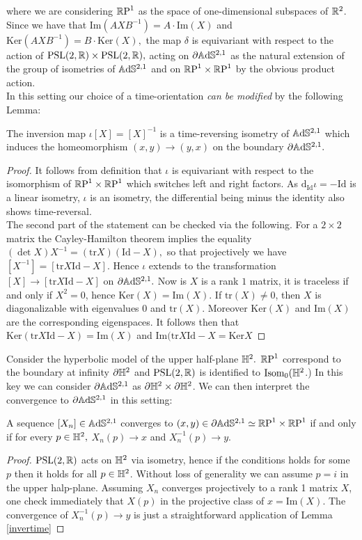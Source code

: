 where we are considering $\mathbb{R}\text{P}^1$ as the space of one-dimensional subspaces of $\mathbb{R}^2$. Since we have that $\text{Im}(AXB^{-1})=A\cdot\text{Im}(X)$ and $\text{Ker} (AXB^{-1})=B\cdot\text{Ker}(X),$ the map $\delta$ is equivariant with respect to the action of $\text{PSL}(2,\mathbb{R})\times\text{PSL}(2,\mathbb{R}),$ acting on $\partial\mathbb{A}\mathrm{d}\mathbb{S}^{2,1}$ as the natural extension of the group of isometries of $\mathbb{A}\mathrm{d}\mathbb{S}^{2,1}$ and on $\mathbb{R}\text{P}^1\times\mathbb{R}\text{P}^1$ by the obvious product action.\\
In this setting our choice of a time-orientation \textit{can be modified} by the following Lemma:
\begin{lemma}\label{invertime}
    The inversion map $\iota[X]=[X]^{-1}$  is a time-reversing isometry of $\mathbb{A}\mathrm{d}\mathbb{S}^{2,1}$ which induces the homeomorphism $(x,y)\to(y,x)$ on the boundary $\partial\mathbb{A}\mathrm{d}\mathbb{S}^{2,1}.$
\end{lemma}
\begin{proof}
    It follows from definition that $\iota$ is equivariant with respect to the isomorphism of $\mathbb{R}\text{P}^1\times\mathbb{R}\text{P}^1$ which switches left and right factors. As $\text{d}_\text{Id}\iota=-\text{Id}$ is a linear isometry, $\iota$ is an isometry, the differential being minus the identity also shows time-reversal. \\
    The second part of the statement can be checked via the following. For a $2\times2$ matrix the Cayley-Hamilton theorem implies the equality $(\det X)X^{-1}=(\text{tr}X)(\text{Id}-X),$ so that projectively we have $[X^{-1}]=[\text{tr}X\text{Id}-X].$ Hence $\iota$ extends to the transformation $[X]\to[\text{tr}X\text{Id}-X]$ on $\partial\mathbb{A}\mathrm{d}\mathbb{S}^{2,1}.$ Now is $X$ is a rank $1$ matrix, it is traceless if and only if $X^2=0$, hence $\text{Ker}(X)=\text{Im}(X).$ If $\text{tr}(X)\neq 0$, then $X$ is diagonalizable with eigenvalues $0$ and $\text{tr}(X)$. Moreover $\text{Ker}(X)$ and $\text{Im}(X)$ are the corresponding eigenspaces. It follows then that $\text{Ker}(\text{tr}X\text{Id}-X)=\text{Im}(X)$ and $\text{Im}(\text{tr}X\text{Id}-X=\text{Ker}X$ 
\end{proof}


Consider the hyperbolic model of the upper half-plane $\mathbb{H}^2.$ $\mathbb{R}\text{P}^1$ correspond to the boundary at infinity $\partial\mathbb{H}^2$ and $\text{PSL}(2,\mathbb{R})$ is identified to $\text{Isom}_0(\mathbb{H}^2$.) In this key we can consider $\partial\mathbb{A}\mathrm{d}\mathbb{S}^{2,1}$ as $\partial\mathbb{H}^2\times\partial\mathbb{H}^2$. We can then interpret the convergence to $\partial\mathbb{A}\mathrm{d}\mathbb{S}^{2,1}$ in this setting:

\begin{lemma}
    A sequence $[X_n]\in\mathbb{A}\mathrm{d}\mathbb{S}^{2,1}$ converges to $(x,y)\in\partial\mathbb{A}\mathrm{d}\mathbb{S}^{2,1}\simeq\mathbb{R}\text{P}^1\times\mathbb{R}\text{P}^1$ if and only if for every $p\in\mathbb{H}^2,$ $X_n(p)\to x$ and $X_n^{-1}(p)\to y.$ 
\end{lemma}
\begin{proof}
    $\text{PSL}(2,\mathbb{R})$ acts on $\mathbb{H}^2$ via isometry, hence if the conditions holds for some $p$ then it holds for all $p\in\mathbb{H}^2$. Without loss of generality we can assume $p=i$ in the upper halp-plane. Assuming $X_n$ converges projectively to a rank 1 matrix $X$, one check immediately that $X(p)$ in the projective class of $x=\text{Im}(X).$ The convergence of $X_n^{-1}(p)\to y$ is just a straightforward application of Lemma \ref{invertime}
\end{proof}

